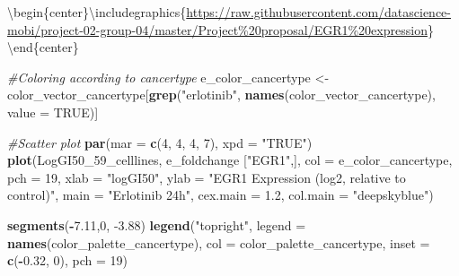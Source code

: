 \documentclass[]{article}
\newenvironment{Shaded}{\begin{snugshade}}{\end{snugshade}}
\newcommand{\CommentTok}[1]{\textcolor[rgb]{0.56,0.35,0.01}{\textit{#1}}}
\newcommand{\DataTypeTok}[1]{\textcolor[rgb]{0.13,0.29,0.53}{#1}}
\newcommand{\DecValTok}[1]{\textcolor[rgb]{0.00,0.00,0.81}{#1}}
\newcommand{\FloatTok}[1]{\textcolor[rgb]{0.00,0.00,0.81}{#1}}
\newcommand{\KeywordTok}[1]{\textcolor[rgb]{0.13,0.29,0.53}{\textbf{#1}}}
\newcommand{\NormalTok}[1]{#1}
\newcommand{\OperatorTok}[1]{\textcolor[rgb]{0.81,0.36,0.00}{\textbf{#1}}}
\newcommand{\OtherTok}[1]{\textcolor[rgb]{0.56,0.35,0.01}{#1}}
\newcommand{\StringTok}[1]{\textcolor[rgb]{0.31,0.60,0.02}{#1}}
\begin{document}
\begin{Shaded}
\end{Shaded}

\textbackslash begin\{center\}\textbackslash includegraphics\{\url{https://raw.githubusercontent.com/datascience-mobi/project-02-group-04/master/Project\%20proposal/EGR1\%20expression}\}
\textbackslash end\{center\}

\begin{Shaded}
\begin{Highlighting}[]
\CommentTok{#Coloring according to cancertype}
\NormalTok{e_color_cancertype <-}\StringTok{ }\NormalTok{color_vector_cancertype[}\KeywordTok{grep}\NormalTok{(}\StringTok{"erlotinib"}\NormalTok{, }\KeywordTok{names}\NormalTok{(color_vector_cancertype), }\DataTypeTok{value =} \OtherTok{TRUE}\NormalTok{)]}

\CommentTok{#Scatter plot}
\KeywordTok{par}\NormalTok{(}\DataTypeTok{mar =} \KeywordTok{c}\NormalTok{(}\DecValTok{4}\NormalTok{, }\DecValTok{4}\NormalTok{, }\DecValTok{4}\NormalTok{, }\DecValTok{7}\NormalTok{), }\DataTypeTok{xpd =} \StringTok{"TRUE"}\NormalTok{)}
\KeywordTok{plot}\NormalTok{(LogGI50_}\DecValTok{59}\NormalTok{_celllines, e_foldchange [}\StringTok{"EGR1"}\NormalTok{,], }
     \DataTypeTok{col =}\NormalTok{ e_color_cancertype, }
     \DataTypeTok{pch =} \DecValTok{19}\NormalTok{, }
     \DataTypeTok{xlab =} \StringTok{"logGI50"}\NormalTok{, }
     \DataTypeTok{ylab =} \StringTok{"EGR1 Expression (log2, relative to control)"}\NormalTok{,        }
     \DataTypeTok{main =} \StringTok{"Erlotinib 24h"}\NormalTok{, }
     \DataTypeTok{cex.main =} \FloatTok{1.2}\NormalTok{, }
     \DataTypeTok{col.main =} \StringTok{"deepskyblue"}\NormalTok{)}

\KeywordTok{segments}\NormalTok{(}\OperatorTok{-}\FloatTok{7.11}\NormalTok{,}\DecValTok{0}\NormalTok{, }\FloatTok{-3.88}\NormalTok{)}
\KeywordTok{legend}\NormalTok{(}\StringTok{"topright"}\NormalTok{, }
       \DataTypeTok{legend =} \KeywordTok{names}\NormalTok{(color_palette_cancertype), }
       \DataTypeTok{col =}\NormalTok{ color_palette_cancertype, }
       \DataTypeTok{inset =} \KeywordTok{c}\NormalTok{(}\OperatorTok{-}\FloatTok{0.32}\NormalTok{, }\DecValTok{0}\NormalTok{),}
       \DataTypeTok{pch =} \DecValTok{19}\NormalTok{)}



\end{Highlighting}
\end{Shaded}
\end{document}
